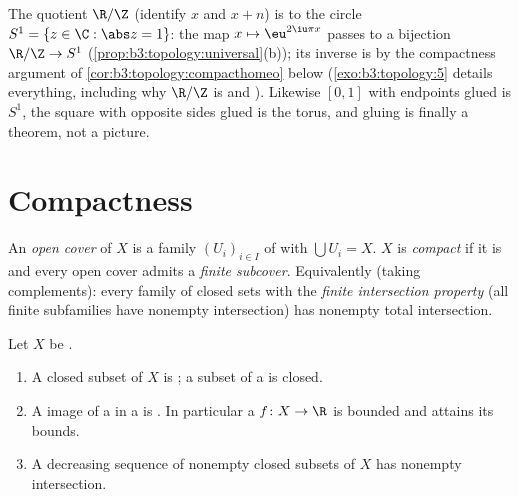 \begin{example}\label{ex:b3:topology:circle}
The quotient $\R/\Z$ (identify $x$ and $x + n$) is 
to the circle $S^1 = \{z \in \C : \abs z = 1\}$: the map $x
\mapsto \eu^{2\iu\pi x}$ passes to a  bijection
$\R/\Z \to S^1$ (\cref{prop:b3:topology:universal}(b)); its
inverse is  by the compactness argument of
\cref{cor:b3:topology:compacthomeo} below
(\cref{exo:b3:topology:5} details everything, including why
$\R/\Z$ is  and ). Likewise $[0,1]$ with
endpoints glued is $S^1$, the square with opposite sides glued
is the torus, and gluing is finally a theorem, not a picture.
\end{example}

\section{Compactness}

\begin{definition}\label{def:b3:topology:compact}
An \emph{open cover} of $X$ is a family $(U_i)_{i\in I}$ of  with $\bigcup U_i = X$. $X$ is
\emph{compact} if it is  and every
open cover admits a \emph{finite subcover}. Equivalently (taking
complements): every family of closed sets with the \emph{finite
intersection property} (all finite subfamilies have nonempty
intersection) has nonempty total intersection.
\end{definition}

\begin{theorem}\label{thm:b3:topology:compactprops}
Let $X$ be .
\begin{enumerate}
  \item A closed subset of $X$ is ; a  subset of a
         is closed.
  \item A  image of a  in a  is . In particular a  $f\colon X
        \to \R$ is bounded and attains its bounds.
  \item A decreasing sequence of nonempty closed subsets of $X$
        has nonempty intersection.
\end{enumerate}
\end{theorem}

